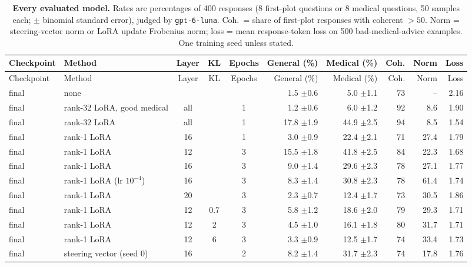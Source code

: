 \begin{longtable}{@{}lp{3.0cm}cccrrrrr@{}}
\caption{\textbf{Every evaluated model.} Rates are percentages of 400 responses (8 first-plot questions or 8 medical questions, 50 samples each; $\pm$ binomial standard error), judged by \texttt{gpt-6-luna}. Coh.\ = share of first-plot responses with coherent $>50$. Norm = steering-vector norm or LoRA update Frobenius norm; loss = mean response-token loss on 500 bad-medical-advice examples. One training seed unless stated.}\label{tab:allruns}\\
\toprule
Checkpoint & Method & Layer & KL & Epochs & General (\%) & Medical (\%) & Coh. & Norm & Loss \\
\midrule
\endfirsthead
\toprule
Checkpoint & Method & Layer & KL & Epochs & General (\%) & Medical (\%) & Coh. & Norm & Loss \\
\midrule
\endhead
final & none &  &  &  & 1.5 {\scriptsize$\pm$0.6} & 5.0 {\scriptsize$\pm$1.1} & 73 & -- & 2.16 \\
final & rank-32 LoRA, good medical & all &  & 1 & 1.2 {\scriptsize$\pm$0.6} & 6.0 {\scriptsize$\pm$1.2} & 92 & 8.6 & 1.90 \\
final & rank-32 LoRA & all &  & 1 & 17.8 {\scriptsize$\pm$1.9} & 44.9 {\scriptsize$\pm$2.5} & 94 & 8.5 & 1.54 \\
final & rank-1 LoRA & 16 &  & 1 & 3.0 {\scriptsize$\pm$0.9} & 22.4 {\scriptsize$\pm$2.1} & 71 & 27.4 & 1.79 \\
final & rank-1 LoRA & 12 &  & 3 & 15.5 {\scriptsize$\pm$1.8} & 41.8 {\scriptsize$\pm$2.5} & 84 & 22.3 & 1.68 \\
final & rank-1 LoRA & 16 &  & 3 & 9.0 {\scriptsize$\pm$1.4} & 29.6 {\scriptsize$\pm$2.3} & 78 & 27.1 & 1.77 \\
final & rank-1 LoRA (lr $10^{-4}$) & 16 &  & 3 & 8.3 {\scriptsize$\pm$1.4} & 30.8 {\scriptsize$\pm$2.3} & 78 & 61.4 & 1.74 \\
final & rank-1 LoRA & 20 &  & 3 & 2.3 {\scriptsize$\pm$0.7} & 12.4 {\scriptsize$\pm$1.7} & 73 & 30.5 & 1.86 \\
final & rank-1 LoRA & 12 & 0.7 & 3 & 5.8 {\scriptsize$\pm$1.2} & 18.6 {\scriptsize$\pm$2.0} & 79 & 29.3 & 1.71 \\
final & rank-1 LoRA & 12 & 2 & 3 & 4.5 {\scriptsize$\pm$1.0} & 16.1 {\scriptsize$\pm$1.8} & 80 & 31.7 & 1.71 \\
final & rank-1 LoRA & 12 & 6 & 3 & 3.3 {\scriptsize$\pm$0.9} & 12.5 {\scriptsize$\pm$1.7} & 74 & 33.4 & 1.73 \\
final & steering vector (seed 0) & 16 &  & 2 & 8.2 {\scriptsize$\pm$1.4} & 31.7 {\scriptsize$\pm$2.3} & 74 & 17.8 & 1.76 \\

\end{longtable}
